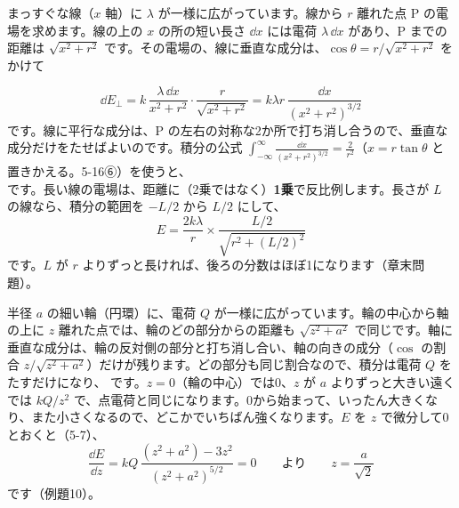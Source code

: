 \noindent\begin{minipage}[c]{0.5\linewidth}\raggedright
まっすぐな線（$x$ 軸）に $\lambda$ が一様に広がっています。線から $r$ 離れた点 P の電場を求めます。線の上の $x$ の所の短い長さ $\dd x$ には電荷 $\lambda\,\dd x$ があり、P までの距離は $\sqrt{x^2+r^2}$ です。その電場の、線に垂直な成分は、$\cos\theta=r/\sqrt{x^2+r^2}$ をかけて
\end{minipage}\hfill
\begin{minipage}[c]{0.47\linewidth}\centering
{}
\label{ph:電-1:fig-sen}
\end{minipage}
\[\dd E_\perp=k\,\frac{\lambda\,\dd x}{x^2+r^2}\cdot\frac{r}{\sqrt{x^2+r^2}}=k\lambda r\,\frac{\dd x}{(x^2+r^2)^{3/2}}\]
です。線に平行な成分は、P の左右の対称な2か所で打ち消し合うので、垂直な成分だけをたせばよいのです。積分の公式 $\displaystyle\int_{-\infty}^{\infty}\frac{\dd x}{(x^2+r^2)^{3/2}}=\frac{2}{r^2}$（$x=r\tan\theta$ と置きかえる。5-16⑥）を使うと、
\label{ph:電-1:sen}です。長い線の電場は、距離に（2乗ではなく）\textbf{1乗}で反比例します。長さが $L$ の線なら、積分の範囲を $-L/2$ から $L/2$ にして、
\[E=\frac{2k\lambda}{r}\times\frac{L/2}{\sqrt{r^2+(L/2)^2}}\]
です。$L$ が $r$ よりずっと長ければ、後ろの分数はほぼ1になります（章末問題）。

半径 $a$ の細い輪（円環）に、電荷 $Q$ が一様に広がっています。輪の中心から軸の上に $z$ 離れた点では、輪のどの部分からの距離も $\sqrt{z^2+a^2}$ で同じです。軸に垂直な成分は、輪の反対側の部分と打ち消し合い、軸の向きの成分（$\cos$ の割合 $z/\sqrt{z^2+a^2}$）だけが残ります。どの部分も同じ割合なので、積分は電荷 $Q$ をたすだけになり、
\label{ph:電-1:enkan}です。$z=0$（輪の中心）では0、$z$ が $a$ よりずっと大きい遠くでは $kQ/z^2$ で、点電荷と同じになります。0から始まって、いったん大きくなり、また小さくなるので、どこかでいちばん強くなります。$E$ を $z$ で微分して0とおくと（5-7）、
\[\frac{\dd E}{\dd z}=kQ\,\frac{(z^2+a^2)-3z^2}{(z^2+a^2)^{5/2}}=0\qquad\text{より}\qquad z=\frac{a}{\sqrt2}\]
です（例題10）。

